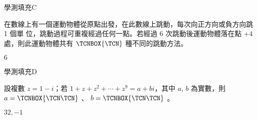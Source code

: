     \begin{QUESTION}
        \begin{ExamInfo}{94}{學測}{填充}{C}
        \end{ExamInfo}
        \begin{ExamAnsRateInfo}{51}{80}{51}{22}
        \end{ExamAnsRateInfo}
        \begin{QBODY}
            在數線上有一個運動物體從原點出發，在此數線上跳動，每次向正方向或負方向跳 1 個單 位，跳動過程可重複經過任何一點。若經過 6 次跳動後運動物體落在點 $+4$ 處，則此運動物體共有 
			$\TCNBOX{\TCN}$ 種不同的跳動方法。
        \end{QBODY}
        \begin{QFROMS}
        \end{QFROMS}
        \begin{QTAGS}\end{QTAGS}
        \begin{QANS}
            $6$
        \end{QANS}
        \begin{QSOLLIST}
        \end{QSOLLIST}
        \begin{QEMPTYSPACE}
        \end{QEMPTYSPACE}
    \end{QUESTION}
    \begin{QUESTION}
        \begin{ExamInfo}{94}{學測}{填充}{D}
        \end{ExamInfo}
        \begin{ExamAnsRateInfo}{21}{48}{14}{1}
        \end{ExamAnsRateInfo}
        \begin{QBODY}
            設複數 $z=1-i$；若 $1+z+z^2 + \cdots +z^9 =a+bi$，其中 $a$, $b$ 為實數，則$ a= \TCNBOX{\TCN\TCN}$ 、 $b=\TCNBOX{\TCN\TCN}$ 。
        \end{QBODY}
        \begin{QFROMS}
        \end{QFROMS}
        \begin{QTAGS}\end{QTAGS}
        \begin{QANS}
            $32, -1$
        \end{QANS}
        \begin{QSOLLIST}
        \end{QSOLLIST}
        \begin{QEMPTYSPACE}
        \end{QEMPTYSPACE}
    \end{QUESTION}

